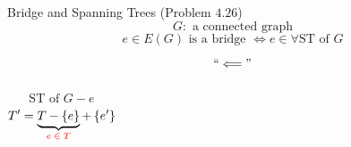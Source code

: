 
\begin{frame}{}
  \begin{exampleblock}{Bridge and Spanning Trees (Problem $4.26$)}
    \[
      G: \text{ a connected graph}
    \]
    \[
      e \in E(G) \text{ is a bridge } \iff e \in \forall \text{ST of } G
    \]
  \end{exampleblock}

  \pause
  \[
    ``\Longleftarrow"
  \]
  \pause
  \centerline{}

  \begin{columns}
    \pause
    \[
      \text{ST of } G - e
    \]
    \pause
      \vspace{-0.40cm}
      \[
	T' = \underbrace{T - \left\{e\right\}}_{\textcolor{red}{e \;\in\; T}} + \left\{e'\right\}
      \]
  \end{columns}
\end{frame}
